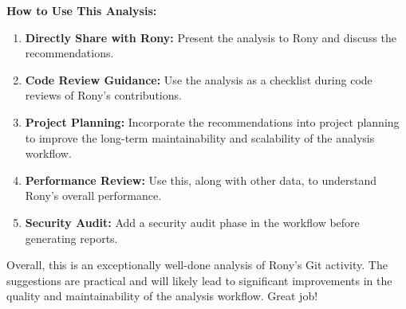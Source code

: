 \documentclass{article}
\begin{document}
\begin{itemize}
\begin{itemize}
\begin{itemize}
            \textbf{How to Use This Analysis:}
             \begin{enumerate}
                \item \textbf{Directly Share with Rony:} Present the analysis to Rony and discuss the recommendations.
                \item \textbf{Code Review Guidance:} Use the analysis as a checklist during code reviews of Rony's contributions.
                \item \textbf{Project Planning:} Incorporate the recommendations into project planning to improve the long-term maintainability and scalability of the analysis workflow.
                \item \textbf{Performance Review:} Use this, along with other data, to understand Rony's overall performance.
                \item \textbf{Security Audit:} Add a security audit phase in the workflow before generating reports.
            \end{enumerate}
            Overall, this is an exceptionally well-done analysis of Rony's Git activity. The suggestions are practical and will likely lead to significant improvements in the quality and maintainability of the analysis workflow. Great job!


\end{itemize}
\end{itemize}
\end{itemize}
\end{document}
